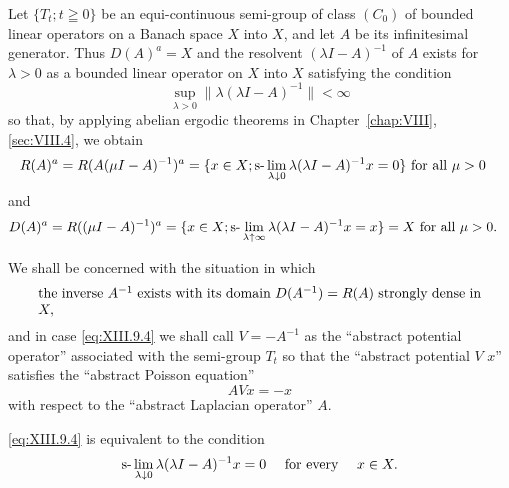 \label{sec:XIII.9}

Let $\{T_{t}; t \geqq 0\}$ be an equi-continuous semi-group of class $(C_0)$ of bounded linear operators on a Banach space $X$ into $X$, and let $A$ be its infinitesimal generator. Thus $D(A)^a = X$ and the resolvent $(\lambda I - A)^{-1}$ of $A$ exists for $\lambda > 0$ as a bounded linear operator on $X$ into $X$ satisfying the condition 
\begin{equation}\label{eq:XIII.9.1}
\sup\limits _{\lambda > 0} \| \lambda (\lambda I - A) ^{-1} \| < \infty
\end{equation}
so that, by applying abelian ergodic theorems in Chapter~\ref{chap:VIII}, \ref{sec:VIII.4}, we obtain 
\begin{equation}\label{eq:XIII.9.2}
\begin{aligned}
&R (A) ^{a}  = R (A (\mu I - A) ^{-1}) ^{a} = \{x \in X; \text{s-}\lim _{\lambda \downarrow 0} \lambda (\lambda I - A) ^{-1} x = 0 \} \text{ for all } \mu > 0
\end{aligned}
\end{equation}
and 
\begin{equation}\label{eq:XIII.9.3}
\begin{aligned}
&D (A) ^{a}  = R ((\mu I - A) ^{-1}) ^{a} = \{x \in X; \text{s-}\lim _{\lambda \uparrow \infty} \lambda (\lambda I - A) ^{-1} x = x \} = X \text{ for all } \mu > 0.
\end{aligned}
\end{equation}

We shall be concerned with the situation in which 
\begin{equation}
\label{eq:XIII.9.4}
\begin{minipage}{0.92\linewidth}
\everymath{}\let\limits\nolimits
the inverse $A^{-1}$ exists with its domain $D(A^{-1}) = R(A)$ strongly dense in $X,$
\end{minipage}
\end{equation}
and in case \eqref{eq:XIII.9.4} we shall call $V = -A^{-1}$ as the ``abstract potential operator'' associated with the semi-group $T_{t}$ so that the ``abstract potential $V$ $x$'' satisfies the ``abstract Poisson equation'' 
\begin{equation}\label{eq:XIII.9.5}
A V x = - x
\end{equation}
with respect to the ``abstract Laplacian operator'' $A$. 

\begin{proposition}\label{prop:XIII.9.Proposition.1} \eqref{eq:XIII.9.4} is equivalent to the condition 
\begin{equation}\label{eq:XIII.9.6}
\text{s-}\lim _{\lambda \downarrow 0} \lambda (\lambda I - A) ^{-1} x = 0 \quad \text{ for every } \quad x \in X.
\end{equation}
\end{proposition}

